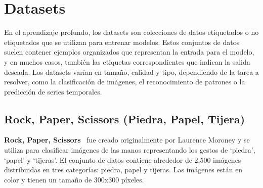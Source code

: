 \begin{table}[htp]
    \centering
    \caption{Resultados de la generación inicial con \textbf{MobileNet}}
    \label{tab:initial-generation-mobilenet}
\end{table}



\section{Datasets}\label{sec:datasets}
En el aprendizaje profundo, los datasets son colecciones de datos etiquetados o no etiquetados que se utilizan para
entrenar modelos.
Estos conjuntos de datos suelen contener ejemplos organizados que representan la entrada para el modelo, y en muchos
casos, también las etiquetas correspondientes que indican la salida deseada.
Los datasets varían en tamaño, calidad y tipo, dependiendo de la tarea a resolver, como la clasificación de imágenes,
el reconocimiento de patrones o la predicción de series temporales.

\subsection{Rock, Paper, Scissors (Piedra, Papel, Tijera)}\label{subsec:rock-paper-scissors}
\textbf{Rock, Paper, Scissors}~\cite{Rock Paper Scissors Dataset} fue creado originalmente por Laurence Moroney y se
utiliza para clasificar imágenes de las manos representando los gestos de `piedra', `papel' y `tijeras'.
El conjunto de datos contiene alrededor de 2,500 imágenes distribuidas en tres categorías: piedra, papel y tijeras.
Las imágenes están en color y tienen un tamaño de 300x300 píxeles. \\[6pt]

